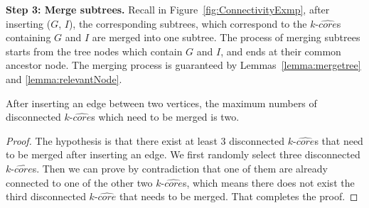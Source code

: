 


\textbf{Step 3: Merge subtrees.}
Recall in Figure~\ref{fig:ConnectivityExmp}, after inserting ($G$, $I$), the corresponding subtrees, which correspond to the $k$-$\widehat{core}$s containing $G$ and $I$ are merged into one subtree. The process of merging subtrees starts from the tree nodes which contain $G$ and $I$, and ends at their common ancestor node.
The merging process is guaranteed by Lemmas~\ref{lemma:mergetree} and \ref{lemma:relevantNode}.

\begin{lemma}
\label{lemma:mergetree}
After inserting an edge between two vertices, the maximum numbers of disconnected $k$-$\widehat{core}$s
which need to be merged is two.
\end{lemma}
\begin{proof}
The hypothesis is that there exist at least 3 disconnected $k$-$\widehat{core}$s that need to be merged after inserting an edge. 
We first randomly select three disconnected $k$-$\widehat{core}$s. Then we can prove by contradiction that one of them are already connected to one of the other two $k$-$\widehat{core}$s, which means there does not exist the third disconnected $k$-$\widehat{core}$ that needs to be merged. That completes the proof.  
\end{proof}

